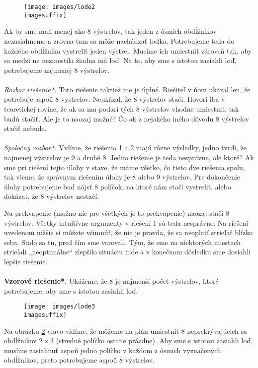 {{\begin{figure}[h]
    \centering
    \texttt{[image: images/lode2\\imagesuffix]}
    \caption{}
    \label{fig:lode2}
\end{figure}

Ak by sme mali menej ako 8 výstrelov, tak jeden z ôsmich obdĺžnikov nezasiahneme a zrovna tam sa môže nachádzať loďka. Potrebujeme teda do každého obdĺžnika vystreliť jeden výstrel. Musíme ich umiestniť zároveň tak, aby sa medzi ne nezmestila žiadna iná loď. Na to, aby sme s istotou zasiahli loď, potrebujeme najmenej 8 výstrelov.\\
\\
\textit{Rozbor riešenia*.} Toto riešenie taktiež nie je úplné. Riešiteľ v ňom ukázal len, že potrebuje aspoň 8 výstrelov. Neukázal, že 8 výstrelov stačí. Hovorí iba v teoretickej rovine, že ak sa mu podarí tých 8 výstrelov vhodne umiestniť, tak budú stačiť. Ale je to naozaj možné? Čo ak z nejakého iného dôvodu 8 výstrelov stačiť nebude.\\
\\
\textit{Spoločný rozbor*.} Vidíme, že riešenia 1 a 2 majú rôzne výsledky, jedno tvrdí, že najmenej výstrelov je 9 a druhé 8. Jedno riešenie je teda nesprávne, ale ktoré? Ak sme pri riešení tejto úlohy v stave, že máme všetko, čo tieto dve riešenia spolu, tak vieme, že správnym riešením úlohy je 8 alebo 9 výstrelov. Pre dokončenie úlohy potrebujeme buď nájsť 8 políčok, na ktoré nám stačí vystreliť, alebo dokázať, že 8 výstrelov nestačí.

Na prekvapenie (možno nie pre všetkých je to prekvapenie) naozaj stačí 8 výstrelov. Všetky intuitívne argumenty v riešení 1 sú teda nesprávne. Na riešení uvedenom nižšie si môžete všimnúť, že nie je pravda, že sa neoplatí strieľať blízko seba. Stalo sa tu, pred čím sme varovali. Tým, že sme na niektorých miestach strieľali „neoptimálne“ zlepšilo situáciu inde a v konečnom dôsledku sme dosiahli lepšie riešenie.\\
\\
\textbf{Vzorové riešenie*.} Ukážeme, že 8 je najmenší počet výstrelov, ktorý potrebujeme, aby sme s istotou zasiahli loď.

\begin{figure}[h]
    \centering
    \texttt{[image: images/lode3\\imagesuffix]}
    \caption{}
    \label{fig:lode3}
\end{figure}


Na obrázku \ref{fig:lode3} vľavo vidíme, že môžeme na plán umiestniť 8 neprekrývajúcich sa obdĺžnikov $2\times 3$ (stredné políčko ostane prázdne). Aby sme s istotou zasiahli loď, musíme zasiahnuť aspoň jedno políčko v každom z ôsmich vyznačených obdĺžnikov, preto potrebujeme aspoň 8 výstrelov.

}}
